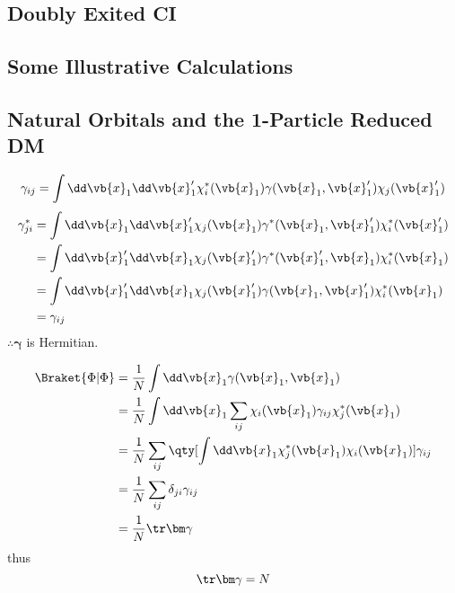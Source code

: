 \documentclass[a4paper]{article}
\begin{document}
\subsection{Doubly Exited CI}

\subsection{Some Illustrative Calculations}

\subsection{Natural Orbitals and the 1-Particle Reduced DM}
\begin{equation}\label{key}
\gamma_{ij} = \int\dd\vb{x}_1\dd\vb{x}'_1 \chi_i^*(\vb{x}_1) \gamma(\vb{x}_1,\vb{x}'_1) \chi_j(\vb{x}'_1)
\end{equation}
\begin{align}
\gamma_{ji}^* &= \int\dd\vb{x}_1\dd\vb{x}'_1 \chi_j(\vb{x}_1) \gamma^*(\vb{x}_1,\vb{x}'_1) \chi_i^*(\vb{x}'_1) \notag\\
&= \int\dd\vb{x}'_1\dd\vb{x}_1 \chi_j(\vb{x}'_1) \gamma^*(\vb{x}'_1,\vb{x}_1) \chi_i^*(\vb{x}_1) \notag\\
&= \int\dd\vb{x}'_1\dd\vb{x}_1 \chi_j(\vb{x}'_1) \gamma(\vb{x}_1,\vb{x}'_1) \chi_i^*(\vb{x}_1) \notag\\
&= \gamma_{ij}
\end{align}
$ \therefore \bm\gamma$ is Hermitian.

\begin{align}
\Braket{\Phi | \Phi} 
&= \dfrac{1}{N} \int\dd\vb{x}_1  \gamma(\vb{x}_1,\vb{x}_1) \notag\\
&= \dfrac{1}{N} \int\dd\vb{x}_1  \sum_{ij} \chi_i(\vb{x}_1) \gamma_{ij} \chi_j^*(\vb{x}_1) \notag\\
&= \dfrac{1}{N} \sum_{ij} \qty[\int\dd\vb{x}_1 \chi_j^*(\vb{x}_1) \chi_i(\vb{x}_1)] \gamma_{ij}  \notag\\
&= \dfrac{1}{N} \sum_{ij} \delta_{ji} \gamma_{ij} \notag\\
&= \dfrac{1}{N} \tr \bm\gamma
\end{align}
thus
\begin{equation}\label{key}
\tr \bm\gamma = N
\end{equation}
\end{document}
